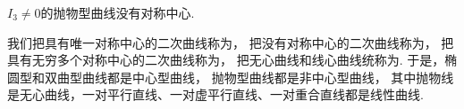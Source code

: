 \begin{theorem}
\(I_3 \neq 0\)的抛物型曲线没有对称中心.
\end{theorem}

我们把具有唯一对称中心的二次曲线称为，
把没有对称中心的二次曲线称为，
把具有无穷多个对称中心的二次曲线称为，
把无心曲线和线心曲线统称为.
于是，椭圆型和双曲型曲线都是中心型曲线，
抛物型曲线都是非中心型曲线，
其中抛物线是无心曲线，一对平行直线、一对虚平行直线、一对重合直线都是线性曲线.
